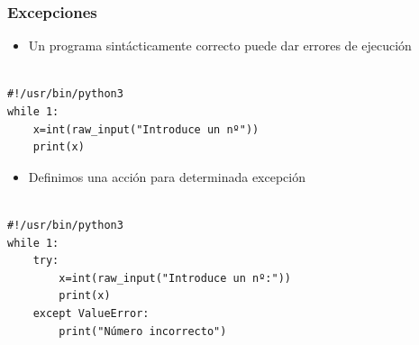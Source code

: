 \documentclass{beamer}
\begin{document}








\begin{frame}[fragile]
\frametitle{Excepciones}
\begin{itemize}
\item Un programa sintácticamente correcto puede dar errores de ejecución
\end{itemize}

  \begin{footnotesize}
\begin{verbatim}

#!/usr/bin/python3
while 1:
    x=int(raw_input("Introduce un nº"))
    print(x)

\end{verbatim}
  \end{footnotesize}

\end{frame}




\begin{frame}[fragile]

\begin{itemize}
\item  Definimos una acción para determinada excepción
\end{itemize}

  \begin{footnotesize}
\begin{verbatim}

#!/usr/bin/python3
while 1:
    try:
        x=int(raw_input("Introduce un nº:"))
        print(x)
    except ValueError:
        print("Número incorrecto")

\end{verbatim}
  \end{footnotesize}


\end{frame}
\end{document}
